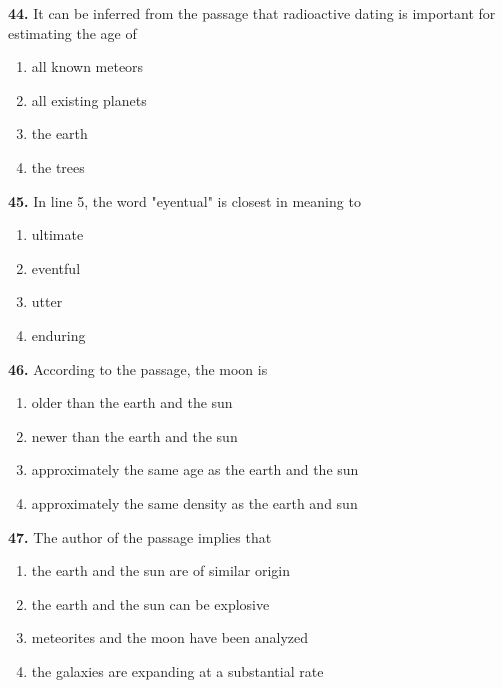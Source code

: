 \documentclass[12pt]{article}
\begin{document}
\par
\vspace{0.25\baselineskip}
\noindent\textbf{44.} It can be inferred from the passage that radioactive dating is important for estimating the age of
\begin{enumerate}[label=(\Alph*),leftmargin=*,itemsep=0.2em]
\item all known meteors
\item all existing planets
\item the earth
\item the trees
\end{enumerate}
\par
\vspace{0.25\baselineskip}
\noindent\textbf{45.} In line 5, the word "eyentual" is closest in meaning to
\begin{enumerate}[label=(\Alph*),leftmargin=*,itemsep=0.2em]
\item ultimate
\item eventful
\item utter
\item enduring
\end{enumerate}
\par
\vspace{0.25\baselineskip}
\noindent\textbf{46.} According to the passage, the moon is
\begin{enumerate}[label=(\Alph*),leftmargin=*,itemsep=0.2em]
\item older than the earth and the sun
\item newer than the earth and the sun
\item approximately the same age as the earth and the sun
\item approximately the same density as the earth and sun
\end{enumerate}
\par
\vspace{0.25\baselineskip}
\noindent\textbf{47.} The author of the passage implies that
\begin{enumerate}[label=(\Alph*),leftmargin=*,itemsep=0.2em]
\item the earth and the sun are of similar origin
\item the earth and the sun can be explosive
\item meteorites and the moon have been analyzed
\item the galaxies are expanding at a substantial rate
\end{enumerate}
\par
\end{document}
